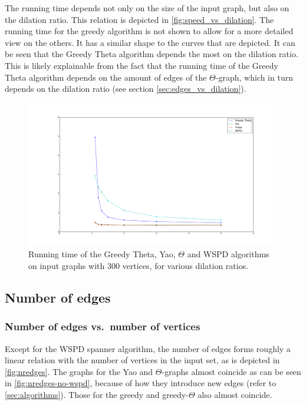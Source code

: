 \documentclass[a4paper,twoside,11pt,hidelinks]{article}
\theoremstyle{plain}
\theoremstyle{definition}  %
\begin{document}
The running time depends not only on the size of the input graph, but also on the dilation ratio. This relation is depicted in \autoref{fig:speed_vs_dilation}. The running time for the greedy algorithm is not shown to allow for a more detailed view on the others. It has a similar shape to the curves that are depicted. It can be seen that the Greedy Theta algorithm depends the most on the dilation ratio. This is likely explainable from the fact that the running time of the Greedy Theta algorithm depends on the amount of edges of the $\Theta$-graph, which in turn depends on the dilation ratio (see section \ref{sec:edges_vs_dilation}).

\begin{figure}[h]
    \centering
    \includegraphics[width=\textwidth]{figures/Running_time_vs_dilation_wo_greedy}
    \caption{Running time of the Greedy Theta, Yao, $\Theta$ and WSPD algorithms on input graphs with 300 vertices, for various dilation ratios.}
    \label{fig:speed_vs_dilation}
\end{figure}

\subsection{Number of edges}
\label{sec:results:nredges}

\subsubsection{Number of edges vs.\ number of vertices}
\label{sec:edges_vs_vertices}

Except for the WSPD spanner algorithm, the number of edges forms roughly a linear relation with the number of vertices in the input set, as is depicted in \autoref{fig:nredges}. The graphs for the Yao and $\Theta$-graphs almost coincide as can be seen in \autoref{fig:nredges-no-wspd}, because of how they introduce new edges (refer to \autoref{sec:algorithms}). Those for the greedy and greedy-$\Theta$ also almost coincide.
\end{document}

